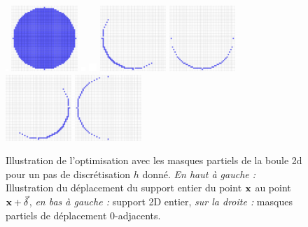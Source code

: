 \begin{figure}[th]
  \centerline{\includegraphics[width=0.1cm,keepaspectratio=false]{images/misc/TransparentPixel}
  \includegraphics[width=2.5cm]{images/digitalSnow/testIntegralInvariantCurvatureEstimator-PartialMask4}
  \includegraphics[width=0.17cm,keepaspectratio=false]{images/misc/TransparentPixel}
  \includegraphics[width=0.3cm,keepaspectratio=false]{images/misc/TransparentPixel}
  \includegraphics[width=2.5cm]{images/digitalSnow/testIntegralInvariantCurvatureEstimator-PartialMask8}
  \includegraphics[width=2.5cm]{images/digitalSnow/testIntegralInvariantCurvatureEstimator-PartialMask7}
  \includegraphics[width=2.5cm]{images/digitalSnow/testIntegralInvariantCurvatureEstimator-PartialMask6}
  \includegraphics[width=2.5cm]{images/digitalSnow/testIntegralInvariantCurvatureEstimator-PartialMask5}}
  \caption{Illustration de l'optimisation avec les masques partiels de la boule
  2d  pour un pas de discrétisation $h$ donné. \textit{En haut à gauche :}
  Illustration du déplacement du support entier du point $\mathbf{x}$ au point
  $\mathbf{x}+\vec{\delta}$, \textit{en bas à gauche :} support 2D entier, \emph{sur la
  droite :} masques partiels de déplacement 0-adjacents.
  \label{fig:MovingKernel2D}}
\end{figure}

